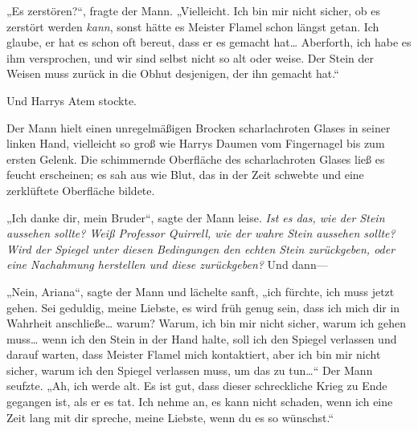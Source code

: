 „Es zerstören?“, fragte der Mann. „Vielleicht. Ich bin mir nicht sicher, ob es zerstört werden \emph{kann}, sonst hätte es Meister Flamel schon längst getan. Ich glaube, er hat es schon oft bereut, dass er es gemacht hat… Aberforth, ich habe es ihm versprochen, und wir sind selbst nicht so alt oder weise. Der Stein der Weisen muss zurück in die Obhut desjenigen, der ihn gemacht hat.“

Und Harrys Atem stockte.

Der Mann hielt einen unregelmäßigen Brocken scharlachroten Glases in seiner linken Hand, vielleicht so groß wie Harrys Daumen vom Fingernagel bis zum ersten Gelenk. Die schimmernde Oberfläche des scharlachroten Glases ließ es feucht erscheinen; es sah aus wie Blut, das in der Zeit schwebte und eine zerklüftete Oberfläche bildete.

„Ich danke dir, mein Bruder“, sagte der Mann leise.
\emph{Ist es das, wie der Stein aussehen sollte? Weiß Professor Quirrell, wie der wahre Stein aussehen sollte? Wird der Spiegel unter diesen Bedingungen den echten Stein zurückgeben, oder eine Nachahmung herstellen und diese zurückgeben?}
Und dann—

„Nein, Ariana“, sagte der Mann und lächelte sanft, „ich fürchte, ich muss jetzt gehen. Sei geduldig, meine Liebste, es wird früh genug sein, dass ich mich dir in Wahrheit anschließe… warum? Warum, ich bin mir nicht sicher, warum ich gehen muss… wenn ich den Stein in der Hand halte, soll ich den Spiegel verlassen und darauf warten, dass Meister Flamel mich kontaktiert, aber ich bin mir nicht sicher, warum ich den Spiegel verlassen muss, um das zu tun…“
Der Mann seufzte.
„Ah, ich werde alt. Es ist gut, dass dieser schreckliche Krieg zu Ende gegangen ist, als er es tat. Ich nehme an, es kann nicht schaden, wenn ich eine Zeit lang mit dir spreche, meine Liebste, wenn du es so wünschst.“

